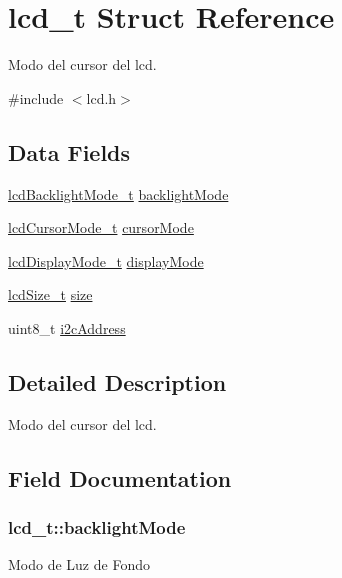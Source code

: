 \hypertarget{structlcd__t}{}\section{lcd\+\_\+t Struct Reference}
\label{structlcd__t}


Modo del cursor del lcd.  




{\ttfamily \#include $<$lcd.\+h$>$}

\subsection*{Data Fields}
\begin{DoxyCompactItemize}
\item 
\hyperlink{lcd_8h_a3ef5fccdfe404962e2ea407fc5781de7}{lcd\+Backlight\+Mode\+\_\+t} \hyperlink{structlcd__t_a3271045c879895fd70921692571bd8fb}{backlight\+Mode}
\item 
\hyperlink{lcd_8h_a480221ccbdca005908233f31313ddc96}{lcd\+Cursor\+Mode\+\_\+t} \hyperlink{structlcd__t_af835e6807732a6fe1c72731424a5a521}{cursor\+Mode}
\item 
\hyperlink{lcd_8h_ad01dd4e542ecd471a243e5ee100a969a}{lcd\+Display\+Mode\+\_\+t} \hyperlink{structlcd__t_a4b3326dee6a48438d03bb7f00f1eb23d}{display\+Mode}
\item 
\hyperlink{lcd_8h_a490e15a26e0c9653f743bf9987093770}{lcd\+Size\+\_\+t} \hyperlink{structlcd__t_a1c8cb84dd86cbadd6d2501527bfd036b}{size}
\item 
uint8\+\_\+t \hyperlink{structlcd__t_a7c46fdbf5e02f1e7794b9a95c2ee6256}{i2c\+Address}
\end{DoxyCompactItemize}


\subsection{Detailed Description}
Modo del cursor del lcd. 

\subsection{Field Documentation}
\subsubsection[{\texorpdfstring{backlight\+Mode}{backlightMode}}]{ lcd\+\_\+t\+::backlight\+Mode}\hypertarget{structlcd__t_a3271045c879895fd70921692571bd8fb}{}\label{structlcd__t_a3271045c879895fd70921692571bd8fb}
Modo de Luz de Fondo 
